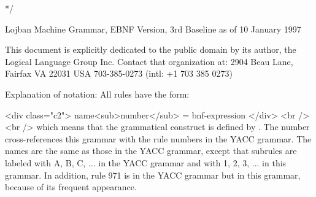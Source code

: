 */



Lojban Machine Grammar, EBNF Version, 3rd Baseline as of 10
    January 1997 

This document is explicitly dedicated to the public domain
    by its author, the Logical Language Group Inc. Contact that
    organization at: 2904 Beau Lane, Fairfax VA 22031 USA
    703-385-0273 (intl: +1 703 385 0273)

Explanation of notation: All rules have the form:

<div class="c2">
      name<sub>number</sub> = bnf-expression
    </div>
    <br />
    <br />
     which means that the grammatical construct  is defined
    by . The number cross-references this grammar
    with the rule numbers in the YACC grammar. The names are the
    same as those in the YACC grammar, except that subrules are
    labeled with A, B, C, ... in the YACC grammar and with 1, 2, 3,
    ... in this grammar. In addition, rule 971 is  in
    the YACC grammar but  in this grammar, because of its
    frequent appearance. 
